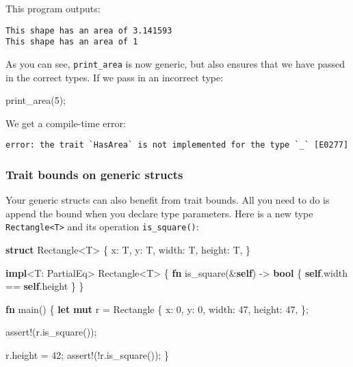 \documentclass[a4paper,]{book}
\newenvironment{Shaded}{\begin{snugshade}}{\end{snugshade}}
\newcommand{\KeywordTok}[1]{\textcolor[rgb]{0.13,0.29,0.53}{\textbf{{#1}}}}
\newcommand{\DecValTok}[1]{\textcolor[rgb]{0.00,0.00,0.81}{{#1}}}
\newcommand{\OtherTok}[1]{\textcolor[rgb]{0.56,0.35,0.01}{{#1}}}
\newcommand{\NormalTok}[1]{{#1}}
\begin{document}
This program outputs:

\begin{verbatim}
This shape has an area of 3.141593
This shape has an area of 1
\end{verbatim}

As you can see, \texttt{print\_area} is now generic, but also ensures
that we have passed in the correct types. If we pass in an incorrect
type:

\begin{Shaded}
\begin{Highlighting}[]
\NormalTok{print_area(}\DecValTok{5}\NormalTok{);}
\end{Highlighting}
\end{Shaded}

We get a compile-time error:

\begin{verbatim}
error: the trait `HasArea` is not implemented for the type `_` [E0277]
\end{verbatim}

\subsubsection{Trait bounds on generic
structs}\label{trait-bounds-on-generic-structs}

Your generic structs can also benefit from trait bounds. All you need to
do is append the bound when you declare type parameters. Here is a new
type \texttt{Rectangle\textless{}T\textgreater{}} and its operation
\texttt{is\_square()}:

\begin{Shaded}
\begin{Highlighting}[]
\KeywordTok{struct} \NormalTok{Rectangle<T> \{}
    \NormalTok{x: T,}
    \NormalTok{y: T,}
    \NormalTok{width: T,}
    \NormalTok{height: T,}
\NormalTok{\}}

\KeywordTok{impl}\NormalTok{<T: PartialEq> Rectangle<T> \{}
    \KeywordTok{fn} \NormalTok{is_square(&}\KeywordTok{self}\NormalTok{) -> }\KeywordTok{bool} \NormalTok{\{}
        \KeywordTok{self}\NormalTok{.width == }\KeywordTok{self}\NormalTok{.height}
    \NormalTok{\}}
\NormalTok{\}}

\KeywordTok{fn} \NormalTok{main() \{}
    \KeywordTok{let} \KeywordTok{mut} \NormalTok{r = Rectangle \{}
        \NormalTok{x: }\DecValTok{0}\NormalTok{,}
        \NormalTok{y: }\DecValTok{0}\NormalTok{,}
        \NormalTok{width: }\DecValTok{47}\NormalTok{,}
        \NormalTok{height: }\DecValTok{47}\NormalTok{,}
    \NormalTok{\};}

    \OtherTok{assert!}\NormalTok{(r.is_square());}

    \NormalTok{r.height = }\DecValTok{42}\NormalTok{;}
    \OtherTok{assert!}\NormalTok{(!r.is_square());}
\NormalTok{\}}
\end{Highlighting}
\end{Shaded}
\end{document}
